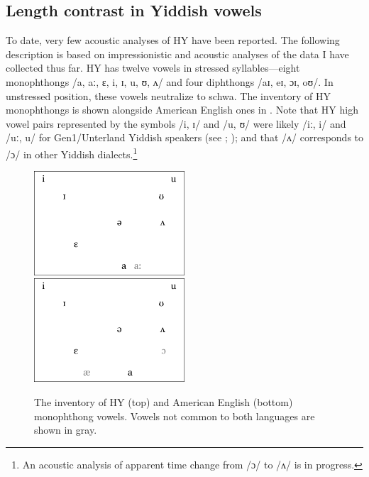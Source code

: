 \documentclass[output=paper]{langsci/langscibook}
\begin{document}
\subsection{Length contrast in Yiddish vowels}
\label{sec:nove:2.3}

To date, very few acoustic analyses of HY have been reported. The following description is based on impressionistic and acoustic analyses of the data I have collected thus far. HY has twelve vowels in stressed syllables—eight monophthongs /a, aː, ɛ, i, ɪ, u, ʊ, ʌ/ and four diphthongs /aɪ, eɪ, ɔɪ, oʊ/. In unstressed position, these vowels neutralize to schwa. The inventory of HY monophthongs is shown alongside American English ones in . Note that HY high vowel pairs represented by the symbols /i, ɪ/ and /u, ʊ/ were likely /iː, i/ and /uː, u/ for Gen1/Unterland Yiddish speakers (see \citealt{Nove2020}; \citealt{Weinreich1964}); and that /ʌ/ corresponds to /ɔ/ in other Yiddish dialects.\footnote{An acoustic analysis of apparent time change from /ɔ/ to /ʌ/ is in progress.} 

\begin{figure}
\includegraphics[width=0.5\textwidth]{figures/nove-fig3-1.pdf}
\includegraphics[width=0.5\textwidth]{figures/nove-fig3-2.pdf}
\caption{The inventory of HY (top) and American English (bottom) monophthong vowels. Vowels not common to both languages are shown in gray.} 
\label{fig:nove:3}
\end{figure}
\end{document}
